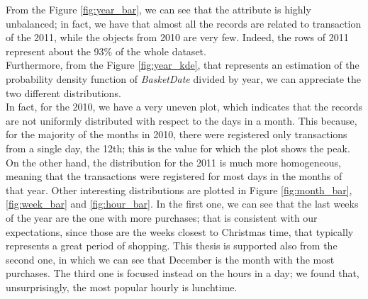 From the Figure \ref{fig:year_bar}, we can see that the attribute is highly unbalanced; in fact, we have that almost all the records are related to transaction of the 2011, while the objects from 2010 are very few. Indeed, the rows of 2011 represent about the 93\% of the whole dataset.\\
Furthermore, from the Figure \ref{fig:year_kde}, that represents an estimation of the probability density function of \emph{BasketDate} divided by year, we can appreciate the two different distributions.\\
In fact, for the 2010, we have a very uneven plot, which indicates that the records are not uniformly distributed with respect to the days in a month. This because, for the majority of the months in 2010, there were registered only transactions from a single day, the 12th; this is the value for which the plot shows the peak.\\
On the other hand, the distribution for the 2011 is much more homogeneous, meaning that the transactions were registered for most days in the months of that year. Other interesting distributions are plotted in Figure \ref{fig:month_bar}, \ref{fig:week_bar} and \ref{fig:hour_bar}. In the first one, we can see that the last weeks of the year are the one with more purchases; that is consistent with our expectations, since those are the weeks closest to Christmas time, that typically represents a great period of shopping. This thesis is supported also from the second one, in which we can see that December is the month with the most purchases. The third one is focused instead on the hours in a day; we found that, unsurprisingly, the most popular hourly is lunchtime.


